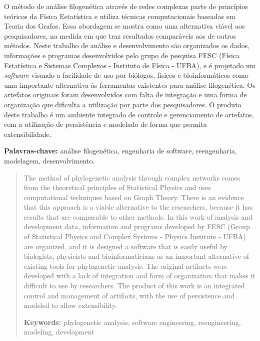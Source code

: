 \documentclass[normaltoc,capchap,capsec,times]{abnt}
\begin{document}



\begin{resumo}

O método de análise filogenética através de redes complexas parte de princípios teóricos da Física Estatística e utiliza técnicas computacionais
baseadas em Teoria dos Grafos. Essa abordagem se mostra como uma alternativa viável aos pesquisadores, na medida em que traz resultados comparáveis aos
de outros métodos. Neste trabalho de análise e desenvolvimento são organizados os dados, informações e programas desenvolvidos pelo grupo
de pesquisa FESC (Física Estatística e Sistemas Complexos - Instituto de Física - UFBA), e é projetado um \textit{software} visando a facilidade de uso
por biólogos, físicos e bioinformáticos como uma importante alternativa às ferramentas existentes para análise filogenética. Os artefatos originais foram
desenvolvidos com falta de integração e uma forma de organização que dificulta a utilização por parte dos pesquisadores. O produto deste trabalho é um
ambiente integrado de controle e gerenciamento de artefatos, com a utilização de persistência e modelado de forma que permita extensibilidade.


\textbf{Palavras-chave:}
análise filogenética,
engenharia de software, 
reengenharia,
modelagem,
desenvolvimento.
\end{resumo}

\begin{abstract}
The method of phylogenetic analysis through complex networks comes from the theoretical principles of Statistical Physics and uses computational
techniques based on Graph Theory. There is an evidence that this approach is a viable alternative to the researchers,
because it has results that are comparable to other methods. In this work of analysis and development data, information and programs developed by FESC
(Group of Statistical Physics
and Complex Systems - Physics Institute - UFBA) are organized, and it is designed a software that is easily useful
 by biologists, physicists and bioinformaticians
as an important alternative of existing tools for phylogenetic analysis. The original artifacts were developed with a lack of integration and form of
organization that makes it difficult to use by researchers. The product of this work is an integrated control and
management of artifacts, with the use of persistence and modeled to allow extensibility.

\textbf{Keywords:} 
phylogenetic analysis,
software engineering,
reengineering,
modeling,
development
\end{abstract}

\listadefiguras
\listadesiglas

\sumario










\end{document}
